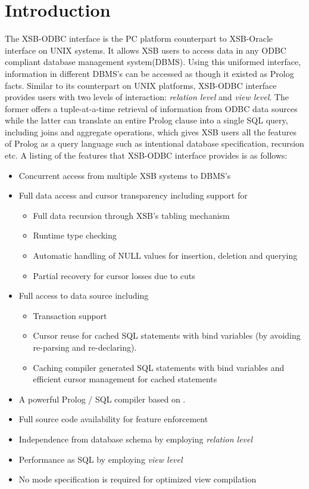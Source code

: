 
\section{Introduction}

The XSB-ODBC interface is the PC platform counterpart to XSB-Oracle
interface on UNIX systems. It allows XSB users to access data in any
ODBC compliant database management system(DBMS). Using this uniformed
interface, information in different DBMS's can be accessed as though it
existed as Prolog facts. Similar to its counterpart on UNIX platforms,
XSB-ODBC interface provides users with two levels of interaction: {\it
relation level} and {\it view level}.  The former offers a
tuple-at-a-time retrieval of information from ODBC data sources while
the latter can translate an entire Prolog clause into a single SQL
query, including joins and aggregate operations, which gives XSB users
all the features of Prolog as a query language such as intentional
database specification, recursion etc.  A listing of the features that
XSB-ODBC interface provides is as follows:
\begin{itemize} 
\item Concurrent access from multiple XSB systems to DBMS's
\item Full data access and cursor transparency including support for
	\begin{itemize}
	\item Full data recursion through XSB's tabling mechanism
	\item Runtime type checking
	\item Automatic handling of NULL values for insertion, 
		deletion and querying
	\item Partial recovery for cursor losses due to cuts
	\end{itemize}
\item Full access to data source including
	\begin{itemize}
	\item Transaction support
	\item Cursor reuse for cached SQL statements 
		with bind variables (by avoiding re-parsing and re-declaring).
	\item Caching compiler generated SQL statements with bind variables 
		and efficient cursor management for cached statements
	\end{itemize}
\item A powerful Prolog / SQL compiler based on \cite{draxler}.
\item Full source code availability for feature enforcement
\item Independence from database schema by employing {\it relation level}
\item Performance as SQL by employing {\it view level} 
\item No mode specification is required for optimized view compilation
\end{itemize}

